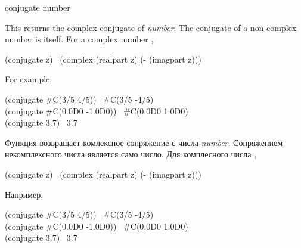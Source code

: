 \begin{defun}[Function]
conjugate number

This returns the complex conjugate of \emph{number}.  The conjugate
of a non-complex number is itself.  For a complex number ,
\begin{lisp}
(conjugate z) \EQ\ (complex (realpart z) (- (imagpart z)))
\end{lisp}
For example:
\begin{lisp}
(conjugate \#C(3/5 4/5)) \EV\ \#C(3/5 -4/5) \\
(conjugate \#C(0.0D0 -1.0D0)) \EV\ \#C(0.0D0 1.0D0) \\
(conjugate 3.7) \EV\ 3.7
\end{lisp}

Функция возвращает комлексное сопряжение с числа \emph{number}. 
Сопряжением некомплексного числа является само число. Для комплесного числа
,
\begin{lisp}
(conjugate z) \EQ\ (complex (realpart z) (- (imagpart z)))
\end{lisp}
Например,
\begin{lisp}
(conjugate \#C(3/5 4/5)) \EV\ \#C(3/5 -4/5) \\
(conjugate \#C(0.0D0 -1.0D0)) \EV\ \#C(0.0D0 1.0D0) \\
(conjugate 3.7) \EV\ 3.7
\end{lisp}
\end{defun}

